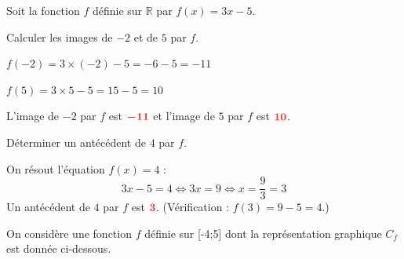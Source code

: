 \documentclass[11pt,a4paper]{article}  %
\begin{document}
	\graphicspath{{images/}}
	
	\begin{center}
	\end{center}
	
	
	Soit la fonction $f$ définie sur $\mathbb{R}$ par $f(x)=3 x-5$.
	\begin{enumMet}
		\item Calculer les images de $-2$ et de $5$ par $f$.
		
		\begin{corrBox}
			$f(-2)=3\times(-2)-5=-6-5=-11$ \quad {}
			
			$f(5)=3\times 5-5=15-5=10$ \quad {}
			
			L'image de $-2$ par $f$ est $\mRouge{-11}$ et l'image de $5$ par $f$ est $\mRouge{10}$.
		\end{corrBox}
		
		\item Déterminer un antécédent de $4$ par $f$. \quad \bareme{1}
		
		\begin{corrBox}
			On résout l'équation $f(x)=4$ :
			\[3x-5=4 \iff 3x=9 \iff x=\dfrac{9}{3}=3\]
			Un antécédent de $4$ par $f$ est $\mRouge{3}$. \quad (Vérification : $f(3)=9-5=4$.)
		\end{corrBox}
	\end{enumMet}
	
	
	On considère une fonction $f$ définie sur [-4;5] dont la représentation graphique $C_f$ est donnée ci-dessous.
	
\end{document}
